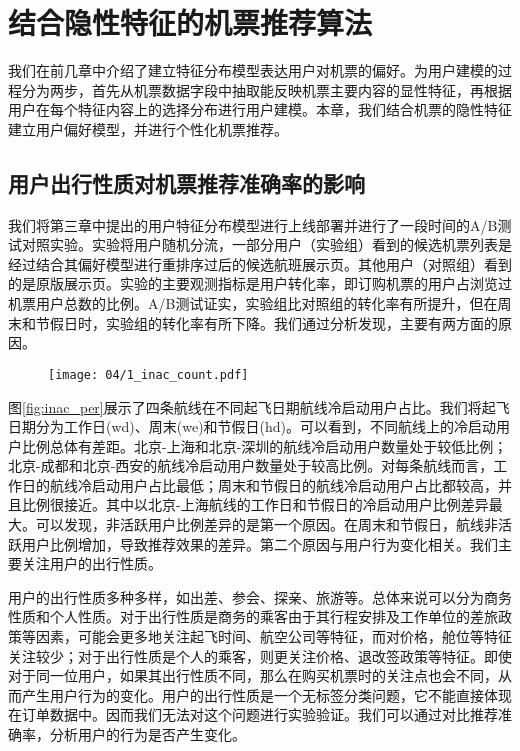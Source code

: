 
\chapter{结合隐性特征的机票推荐算法}
\label{chap:latent}

我们在前几章中介绍了建立特征分布模型表达用户对机票的偏好。为用户建模的过程分为两步，首先从机票数据字段中抽取能反映机票主要内容的显性特征，再根据用户在每个特征内容上的选择分布进行用户建模。本章，我们结合机票的隐性特征建立用户偏好模型，并进行个性化机票推荐。

\section{用户出行性质对机票推荐准确率的影响}

我们将第三章中提出的用户特征分布模型进行上线部署并进行了一段时间的A/B测试对照实验。实验将用户随机分流，一部分用户（实验组）看到的候选机票列表是经过结合其偏好模型进行重排序过后的候选航班展示页。其他用户（对照组）看到的是原版展示页。实验的主要观测指标是用户转化率，即订购机票的用户占浏览过机票用户总数的比例。A/B测试证实，实验组比对照组的转化率有所提升，但在周末和节假日时，实验组的转化率有所下降。我们通过分析发现，主要有两方面的原因。

\begin{figure}
 \centering
 \texttt{[image: 04/1\_inac\_count.pdf]}
\end{figure}

图\ref{fig:inac_per}展示了四条航线在不同起飞日期航线冷启动用户占比。我们将起飞日期分为工作日(wd)、周末(we)和节假日(hd)。可以看到，不同航线上的冷启动用户比例总体有差距。北京-上海和北京-深圳的航线冷启动用户数量处于较低比例；北京-成都和北京-西安的航线冷启动用户数量处于较高比例。对每条航线而言，工作日的航线冷启动用户占比最低；周末和节假日的航线冷启动用户占比都较高，并且比例很接近。其中以北京-上海航线的工作日和节假日的冷启动用户比例差异最大。可以发现，非活跃用户比例差异的是第一个原因。在周末和节假日，航线非活跃用户比例增加，导致推荐效果的差异。第二个原因与用户行为变化相关。我们主要关注用户的出行性质。

用户的出行性质多种多样，如出差、参会、探亲、旅游等。总体来说可以分为商务性质和个人性质。对于出行性质是商务的乘客由于其行程安排及工作单位的差旅政策等因素，可能会更多地关注起飞时间、航空公司等特征，而对价格，舱位等特征关注较少；对于出行性质是个人的乘客，则更关注价格、退改签政策等特征。即使对于同一位用户，如果其出行性质不同，那么在购买机票时的关注点也会不同，从而产生用户行为的变化。用户的出行性质是一个无标签分类问题，它不能直接体现在订单数据中。因而我们无法对这个问题进行实验验证。我们可以通过对比推荐准确率，分析用户的行为是否产生变化。

